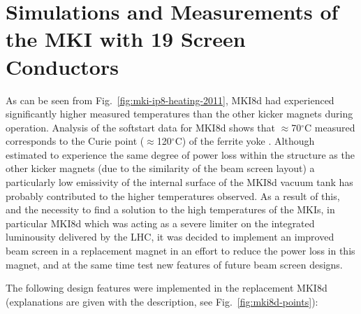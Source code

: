 \section{Simulations and Measurements of the MKI with 19 Screen Conductors}

As can be seen from Fig.~\ref{fig:mki-ip8-heating-2011}, MKI8d had experienced significantly higher measured temperatures than the other kicker magnets during operation. Analysis of the softstart data for MKI8d shows that $\approx$70$^{\circ}$C measured corresponds to the Curie point ($\approx$120$^{\circ}$C) of the ferrite yoke \cite{Barnes:mkiVacTempCool}. Although estimated to experience the same degree of power loss within the structure as the other kicker magnets (due to the similarity of the beam screen layout) a particularly low emissivity of the internal surface of the MKI8d vacuum tank has probably contributed to the higher temperatures observed. As a result of this, and the necessity to find a solution to the high temperatures of the MKIs, in particular MKI8d which was acting as a severe limiter on the integrated luminousity delivered by the LHC, it was decided to implement an improved beam screen in a replacement magnet in an effort to reduce the power loss in this magnet, and at the same time test new features of future beam screen designs.

The following design features were implemented in the replacement MKI8d (explanations are given with the description, see Fig.~\ref{fig:mki8d-points}):

